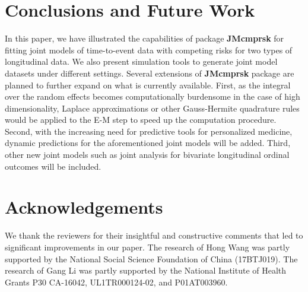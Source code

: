 \section{Conclusions and Future Work}
In this paper, we have illustrated the capabilities of package \textbf{JMcmprsk} for fitting joint models of time-to-event data with competing risks for two types of longitudinal data. We also present simulation tools to generate joint model datasets under different settings. Several extensions of \textbf{JMcmprsk}  package are planned to further expand on what is currently available. First, as the integral over the random effects becomes computationally burdensome in the case of high dimensionality, Laplace approximations or other Gauss-Hermite quadrature rules would be applied to the E-M step to speed up the computation procedure. Second, with the increasing need for predictive tools for personalized medicine, dynamic predictions for the aforementioned joint models will be added. Third, other new joint models such as joint analysis for bivariate longitudinal ordinal outcomes will be included.



\section{Acknowledgements}
We thank the reviewers for their insightful and constructive comments that led to significant improvements in our paper. The research of Hong Wang was partly supported by the National Social Science Foundation of China (17BTJ019). The research of Gang Li was partly supported by the National Institute of Health Grants P30 CA-16042, UL1TR000124-02, and P01AT003960.



\address{Hong Wang\\
  School of Mathematics \& Statistics,Central South University \\
  Changsha, Hunan Provinice,410075\\
  China\\
  }

\address{Ning Li\\
  UCLA Biomathematics\\
  Los Angeles, CA 90095-1772\\
  USA\\
  }

\address{Shanpeng Li\\
  Department of Biostatistics,UCLA School of Public Health\\
  Los Angeles, CA 90095-1772\\
  USA\\
  }

\address{Gang Li*\\
  Department of Biostatistics,UCLA School of Public Health\\
  Los Angeles, CA 90095-1772\\
  USA\\
  (Corresponding Author)\\
  }
